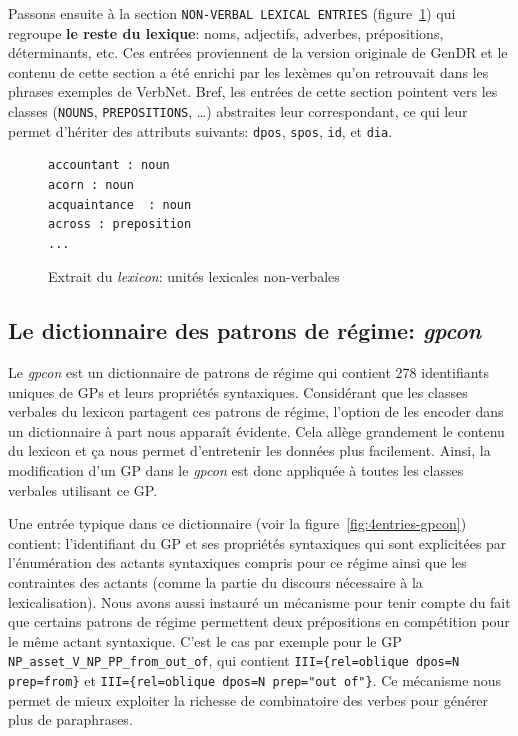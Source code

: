 Passons ensuite à la section \texttt{NON-VERBAL LEXICAL ENTRIES} (figure~\ref{fig:unitenonverbale}) qui regroupe \textbf{le reste du lexique}: noms, adjectifs, adverbes, prépositions, déterminants, etc. Ces entrées proviennent de la version originale de GenDR \citep{lareau18} et le contenu de cette section a été enrichi par les lexèmes qu'on retrouvait dans les phrases exemples de VerbNet. Bref, les entrées de cette section pointent vers les classes (\texttt{NOUNS}, \texttt{PREPOSITIONS}, \ldots) abstraites leur correspondant, ce qui leur permet d'hériter des attributs suivants: \texttt{dpos}, \texttt{spos}, \texttt{id}, et \texttt{dia}.

\begin{figure}[htb]
  \caption{Extrait du \emph{lexicon}: unités lexicales non-verbales}
	\label{fig:unitenonverbale}
\begin{lstlisting}[language=mate]
accountant : noun
acorn : noun
acquaintance  : noun
across : preposition
...
\end{lstlisting}
\end{figure}

\subsection{Le dictionnaire des patrons de régime: \emph{gpcon}}

Le \emph{gpcon} est un dictionnaire de patrons de régime qui contient 278 identifiants uniques de \acp{GP} et leurs propriétés syntaxiques. Considérant que les classes verbales du lexicon partagent ces patrons de régime, l'option de les encoder dans un dictionnaire à part nous apparaît évidente. Cela allège grandement le contenu du lexicon et ça nous permet d'entretenir les données plus facilement. Ainsi, la modification d'un \ac{GP} dans le \emph{gpcon} est donc appliquée à toutes les classes verbales utilisant ce \ac{GP}. 

Une entrée typique dans ce dictionnaire (voir la figure~\ref{fig:4entries-gpcon}) contient: l'identifiant du \ac{GP} et ses propriétés syntaxiques qui sont explicitées par l'énumération des actants syntaxiques compris pour ce régime ainsi que les contraintes des actants (comme la partie du discours nécessaire à la lexicalisation). Nous avons aussi instauré un mécanisme pour tenir compte du fait que certains patrons de régime permettent deux prépositions en compétition pour le même actant syntaxique. C'est le cas par exemple pour le \ac{GP} \texttt{NP\_asset\_V\_NP\_PP\_from\_out\_of}, qui contient \lstinline|III={rel=oblique dpos=N prep=from}| et \lstinline|III={rel=oblique dpos=N prep="out of"}|. Ce mécanisme nous permet de mieux exploiter la richesse de combinatoire des verbes pour générer plus de paraphrases.

